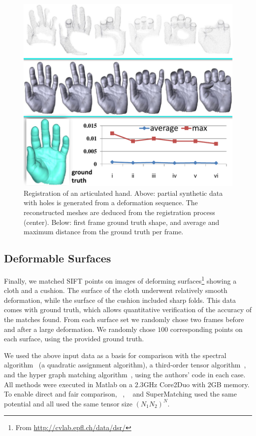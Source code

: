 \begin{figure}[h]
\centering
  \includegraphics[width=0.95\linewidth]{figures/3DHand.pdf}
  \caption{Registration of an articulated hand.
  Above: partial synthetic data with holes is generated from a deformation sequence.
  The reconstructed meshes are deduced from the registration process (center).
  Below: first frame ground truth shape, and average and maximum distance from the ground truth per frame.}
\label{fig:3DHand}
\end{figure}

\subsection{Deformable Surfaces}
\label{subsec:2DDeformable}

Finally, we matched SIFT points on images of deforming surfaces\footnote{From \url{http://cvlab.epfl.ch/data/dsr/}} showing a cloth and a cushion.
The surface of the cloth underwent relatively smooth deformation, while the surface of the cushion included sharp folds.
This data comes with ground truth, which allows quantitative verification of the accuracy of the matches found.
From each surface set we randomly chose two frames before and after a large deformation.
We randomly chose $100$ corresponding points on each surface, using the provided ground truth.

We used the above input data as a basis for comparison with the spectral algorithm~\cite{Cour06} (a quadratic assignment algorithm),
a third-order tensor algorithm~\cite{Duchenne09},
and the hyper graph matching algorithm~\cite{Zass08}, using the authors' code in each case.
All methods were executed in Matlab on a $2.3$GHz Core2Duo with $2$GB memory.
To enable direct and fair comparison,
~\cite{Duchenne09}, ~\cite{Zass08} and SuperMatching
used the same potential and all used the same tensor size $(N_1N_2)^N$.

